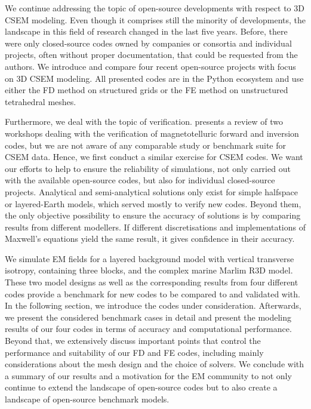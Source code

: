 \documentclass[
    paper,
  ]{geophysics}
\begin{document}
We continue addressing the topic of open-source developments with respect to 3D
CSEM modeling. Even though it comprises still the minority of developments, the
landscape in this field of research changed in the last five years. Before,
there were only closed-source codes owned by companies or  consortia and
individual projects, often without proper documentation, that could be
requested from the authors. We introduce and compare four recent open-source
projects with focus on 3D CSEM modeling. All presented codes are in the Python
ecosystem and use either the FD method on structured grids or the FE method on
unstructured tetrahedral meshes.

Furthermore, we deal with the topic of verification. \cite{GJI.13.Miensopust}
presents a review of two workshops dealing with the verification of
magnetotelluric forward and inversion codes, but we are not aware of any
comparable study or benchmark suite for CSEM data. Hence, we first conduct a
similar exercise for CSEM codes. We want our efforts to help to ensure the
reliability of simulations, not only carried out with the available open-source
codes, but also for individual closed-source projects. Analytical and
semi-analytical solutions only exist for simple halfspace or layered-Earth
models, which served mostly to verify new codes. Beyond them, the only
objective possibility to ensure the accuracy of solutions is by comparing
results from different modellers. If different discretisations and
implementations of Maxwell's equations yield the same result, it gives
confidence in their accuracy.

We simulate EM fields for a layered background model with vertical transverse
isotropy, containing three blocks, and the complex marine Marlim R3D model.
These two model designs as well as the corresponding results from four
different codes provide a benchmark for new codes to be compared to and
validated with. In the following section, we introduce the codes under
consideration. Afterwards, we present the considered benchmark cases in detail
and present the modeling results of our four codes in terms of accuracy and
computational performance. Beyond that, we extensively discuss important points
that control the performance and suitability of our FD and FE codes, including
mainly considerations about the mesh design and the choice of solvers. We
conclude with a summary of our results and a motivation for the EM community to
not only continue to extend the landscape of open-source codes but to also
create a landscape of open-source benchmark models.
\end{document}
